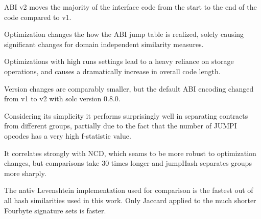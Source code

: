 \documentclass[../main.tex]{subfiles}
\begin{document}
ABI v2 moves the majority of the interface code from the start to the end of the code compared to v1.

Optimization changes the how the ABI jump table is realized, solely causing significant changes for domain independent similarity measures.

Optimizations with high runs settings lead to a heavy reliance on storage operations, and causes a dramatically increase in overall code length.

Version changes are comparably smaller, but the default ABI encoding changed from v1 to v2 with solc version 0.8.0.

Considering its simplicity it performs surprisingly well in separating contracts from different groups, partially due to the fact that the number of JUMPI opcodes has a very high f-statistic value.

It correlates strongly with NCD, which seams to be more robust to optimization changes, but comparisons take 30 times longer and jumpHash separates groups more sharply.

The nativ Levenshtein implementation used for comparison is the fastest out of all hash similarities used in this work. Only Jaccard applied to the much shorter Fourbyte signature sets is faster.
\end{document}
